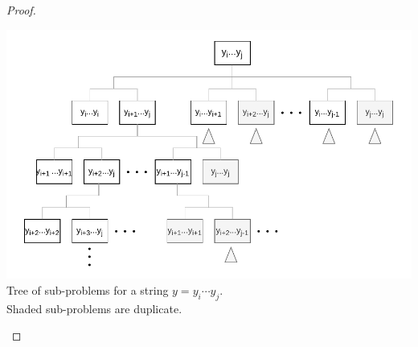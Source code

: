 \documentclass[11pt]{article}
\begin{document}
\begin{proof}
\begin{center}
\includegraphics[scale=1.0]{Figures/Problem7.15b.pdf} \\
Tree of sub-problems for a string $y = y_i \cdots y_j$. \\
Shaded sub-problems are duplicate.
\end{center}

\end{proof}
\end{document}
